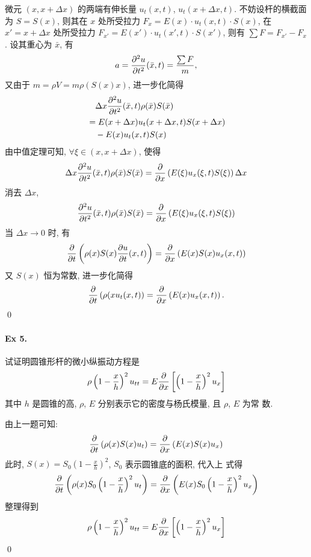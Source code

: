 \begin{solution}
微元 $(x, x + \Delta x)$ 的两端有伸长量 $u_t(x, t)$,
$u_t(x + \Delta x, t)$. 不妨设杆的横截面为 $S = S(x)$, 则其在 $x$ 处所受拉力
$F_x = E(x) \cdot u_t(x, t) \cdot S(x)$, 在 $x' = x + \Delta x$ 处所受拉力
$F_{x'} = E(x') \cdot u_t(x', t)\cdot S(x')$, 则有
$\sum F = F_{x'} - F_x$. 设其重心为 $\bar x$, 有
\[
a = {\frac{\partial {^2u}}{\partial {t^2}}}(\bar x, t) = \frac{\sum F}{m},
\]
又由于 $m = \rho V = m \rho (S(x) x)$, 进一步化简得
\begin{align*}
&\quad\Delta x {\frac{\partial {^2u}}{\partial {t^2}}}(\bar x, t) \rho(\bar x) S(\bar x) \\
&= E(x + \Delta x) u_t(x + \Delta x, t) S(x + \Delta x) \\
&\quad- E(x) u_t(x, t) S(x)
\end{align*}
由中值定理可知, $\forall \xi \in (x, x + \Delta x)$, 使得
\[
\Delta x {\frac{\partial {^2u}}{\partial {t^2}}}(\bar x, t) \rho(\bar x) S(\bar x)
= {{\frac{\partial {}}{\partial {x}}}}\left( E(\xi) u_x(\xi, t) S(\xi) \right) \Delta x
\]
消去 $\Delta x$,
\[
{\frac{\partial {^2u}}{\partial {t^2}}}(\bar x, t) \rho(\bar x) S(\bar x)
= {{\frac{\partial {}}{\partial {x}}}}\left( E(\xi) u_x(\xi, t) S(\xi) \right)
\]
当 $\Delta x \to 0$ 时, 有
\[
{{\frac{\partial {}}{\partial {t}}}}\left( \rho(x)S(x) {\frac{\partial {u}}{\partial {t}}}(x, t) \right)
= {{\frac{\partial {}}{\partial {x}}}}\left( E(x) S(x) u_x(x, t)\right)
\]
又 $S(x)$ 恒为常数, 进一步化简得
\[
{{\frac{\partial {}}{\partial {t}}}}\left( \rho(x u_t(x, t) \right)
= {{\frac{\partial {}}{\partial {x}}}}\left( E(x) u_x(x, t) \right).
\]
\qed
\end{solution}
\paragraph{Ex 5.}
试证明圆锥形杆的微小纵振动方程是
\[
\rho \left(1 - \frac{x}{h}\right)^2 u_{tt}
= E{{\frac{\partial {}}{\partial {x}}}}\left[ \left(1 - \frac{x}{h}\right)^2 u_x \right]
\]
其中 $h$ 是圆锥的高, $\rho$, $E$ 分别表示它的密度与杨氏模量, 且 $\rho$, $E$ 为常
数.

\begin{solution}
由上一题可知:
\[
{{\frac{\partial {}}{\partial {t}}}}\left( \rho(x)S(x) u_t \right)
= {{\frac{\partial {}}{\partial {x}}}}\left( E(x) S(x) u_x \right)
\]
此时, $S(x) = S_0\left(1 - \frac{x}{h}\right)^2$, $S_0$ 表示圆锥底的面积, 代入上
式得
\[
{{\frac{\partial {}}{\partial {t}}}}\left( \rho(x) S_0\left(1 - \frac{x}{h}\right)^2 u_t \right)
= {{\frac{\partial {}}{\partial {x}}}}\left( E(x) S_0\left(1 - \frac{x}{h}\right)^2 u_x \right)
\]
整理得到
\[
\rho \left(1 - \frac{x}{h}\right)^2 u_{tt}
= E{{\frac{\partial {}}{\partial {x}}}}\left[ \left(1 - \frac{x}{h}\right)^2 u_x \right]
\]
\qed
\end{solution}
